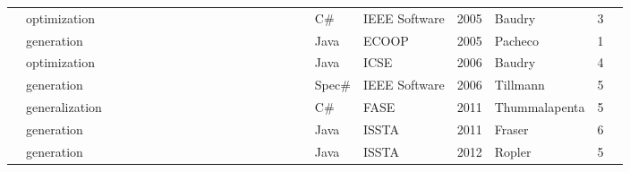 \begin{table*}
\begin{adjustbox}{max width=\textwidth,center=\textwidth}
\begin{tabular}{l|l|llll|llllll|llllll|l|llll|l}
            \cite{Baudry05d}                                & optimization                      & \X &    &    &    & \X &    &    &    &    &    & \X &    &    &    &    & \X & C\#         & IEEE Software                                            & 2005 & Baudry         & 3 \\
            \cite{Pacheco2005}                              & generation                        & \X &    &    &    &    &    & \X &    &    &    & \X &    &    &    &    &    & Java        & ECOOP                                                    & 2005 & Pacheco        & 1 \\
            \cite{Baudry:2006:ITS:1134285.1134299}          & optimization                      & \X &    &    &    &    &    &    & \X &    &    & \X &    &    &    &    &    & Java        & ICSE                                                     & 2006 & Baudry         & 4 \\
            \cite{tillmann2006unit}                         & generation                        & \X &    &    & \X & \X &    &    &    &    &    & \X &    &    &    & \X &    & Spec\#      & IEEE Software                                            & 2006 & Tillmann       & 5 \\
            \cite{marri2010retrofitting}                    & generalization                    & \X &    &    & \X & \X &    &    &    &    &    & \X &    &    &    & \X &    & C\#         & FASE                                                     & 2011 & Thummalapenta  & 5 \\
            \cite{fraser2011generating}                     & generation                        & \X &    &    &    &    &    & \X &    &    &    & \X & \X &    &    &    &    & Java        & ISSTA                                                    & 2011 & Fraser         & 6 \\
            \cite{robetaler2012isolating}                   & generation                        & \X &    &    &    &    &    &    & \X &    &    & \X &    &    &    &    &    & Java        & ISSTA                                                    & 2012 & Ropler         & 5 \\

\end{tabular}
\end{adjustbox}
\end{table*}

